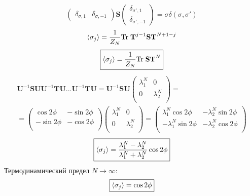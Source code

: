 \documentclass[12pt]{article}
\theoremstyle{definition}
\begin{document}
\begin{enumerate}
\begin{itemize}
\begin{equation}
\begin{pmatrix}
        \delta_{\sigma,1} & \delta_{\sigma,-1}
        \end{pmatrix}\textbf{S}\begin{pmatrix}
        \delta_{\sigma',1}\\\delta_{\sigma',-1}
        \end{pmatrix}=\sigma\delta(\sigma,\sigma')
    \end{equation}
    \begin{equation}
        \braket{\sigma_j}=\frac{1}{Z_N}\text{Tr}\;\textbf{T}^{j-1}\textbf{S}\textbf{T}^{N+1-j}
    \end{equation}
    \begin{equation}
        \boxed{\braket{\sigma_j}=\frac{1}{Z_N}\text{Tr}\;\textbf{S}\textbf{T}^{N}}
    \end{equation}
    \begin{multline}
    \textbf{U}^{-1}\textbf{S}\textbf{U}\textbf{U}^{-1}\textbf{T}\textbf{U}...\textbf{U}^{-1}\textbf{T}\textbf{U}=\textbf{U}^{-1}\textbf{S}\textbf{U}\begin{pmatrix}
            \lambda^N_1 & 0\\
            0 & \lambda^N_2\\
        \end{pmatrix}=\\=\begin{pmatrix}
            \cos2\phi & -\sin2\phi\\
            -\sin2\phi & -\cos2\phi\\
        \end{pmatrix}\begin{pmatrix}
            \lambda^N_1 & 0\\
            0 & \lambda^N_2\\
        \end{pmatrix}=\begin{pmatrix}
            \lambda^N_1\cos2\phi & -\lambda_2^N\sin2\phi\\
            -\lambda_1^N\sin2\phi & -\lambda^N_2\cos2\phi\\
        \end{pmatrix}
    \end{multline}
    \begin{equation}
        \boxed{\braket{\sigma_j}=\frac{\lambda^N_1-\lambda^N_2}{\lambda^N_1+\lambda^N_2}\cos2\phi}
    \end{equation}
    Термодинамический предел $N\rightarrow\infty$:
    \begin{equation}
        \boxed{\braket{\sigma_j}=\cos2\phi}

\end{equation}
\end{itemize}
\end{enumerate}
\end{document}
